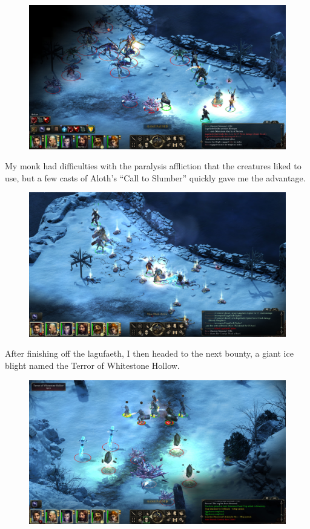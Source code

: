 \documentclass{article}
\begin{document}
\begin{figure}
\includegraphics[scale=0.33]{files/blog/2020_01_18_poe_potd_wmpt2/2020_01_18_bounty1_1.jpg}
\end{figure}

My monk had difficulties with the paralysis affliction that the creatures liked to use, but a few casts of Aloth's ``Call to Slumber'' quickly gave me the advantage.

\begin{figure}
\includegraphics[scale=0.33]{files/blog/2020_01_18_poe_potd_wmpt2/2020_01_18_bounty1_2.jpg}
\end{figure}

After finishing off the lagufaeth, I then headed to the next bounty, a giant ice blight named the Terror of Whitestone Hollow.

\begin{figure}
\includegraphics[scale=0.33]{files/blog/2020_01_18_poe_potd_wmpt2/2020_01_18_bounty2_1.jpg}
\end{figure}
\end{document}
